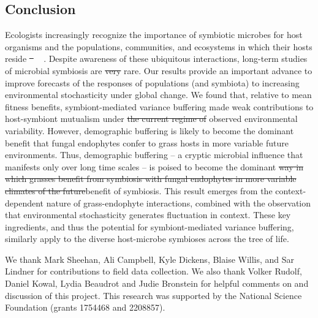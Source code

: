 \documentclass[lineno, sn-basic]{sn-jnl}%
\providecommand{\DIFadd}[1]{{\protect\color{blue}#1}} %
\providecommand{\DIFdel}[1]{{\protect\color{red}\protect\scriptsize\sout{#1}}}
\providecommand{\DIFadd}[1]{{\protect\color{blue}\uwave{#1}}} %
\providecommand{\DIFdel}[1]{{\protect\color{red}\sout{#1}}}                      %
\providecommand{\DIFaddbegin}{} %
\providecommand{\DIFaddend}{} %
\providecommand{\DIFdelbegin}{} %
\providecommand{\DIFdelend}{} %
\newcommand{\DIFscaledelfig}{0.5}
\newlength{\DIFdelgraphicswidth} %
\newlength{\DIFdelgraphicsheight} %
\newcommand{\DIFaddincludegraphics}[2][]{{\color{blue}\fbox{\DIFOincludegraphics[#1]{#2}}}} %
\newcommand{\DIFdelincludegraphics}[2][]{%
\sbox{\DIFdelgraphicsbox}{\DIFOincludegraphics[#1]{#2}}%
\settoboxwidth{\DIFdelgraphicswidth}{\DIFdelgraphicsbox} %
\settoboxtotalheight{\DIFdelgraphicsheight}{\DIFdelgraphicsbox} %
\scalebox{\DIFscaledelfig}{%
\parbox[b]{\DIFdelgraphicswidth}{\usebox{\DIFdelgraphicsbox}\\[-\baselineskip] \rule{\DIFdelgraphicswidth}{0em}}\llap{\resizebox{\DIFdelgraphicswidth}{\DIFdelgraphicsheight}{%
\setlength{\unitlength}{\DIFdelgraphicswidth}%
\begin{picture}(1,1)%
\thicklines\linethickness{2pt} %
{\color[rgb]{1,0,0}\put(0,0){\framebox(1,1){}}}%
{\color[rgb]{1,0,0}\put(0,0){\line( 1,1){1}}}%
{\color[rgb]{1,0,0}\put(0,1){\line(1,-1){1}}}%
\end{picture}%
}\hspace*{3pt}}} %
} %
\DeclareRobustCommand{\DIFaddbegin}{\DIFOaddbegin \let\includegraphics\DIFaddincludegraphics} %
\DeclareRobustCommand{\DIFaddend}{\DIFOaddend \let\includegraphics\DIFOincludegraphics} %
\DeclareRobustCommand{\DIFdelbegin}{\DIFOdelbegin \let\includegraphics\DIFdelincludegraphics} %
\DeclareRobustCommand{\DIFdelend}{\DIFOaddend \let\includegraphics\DIFOincludegraphics} %
\begin{document}
\subsection*{Conclusion}
Ecologists increasingly recognize the importance of symbiotic microbes for host organisms and the populations, communities, and ecosystems in which their hosts reside \DIFdelbegin \DIFdel{\mbox{%
\cite{afkhami2016native,smith2017symbiont,dallas2022captivity,wu2022reduction}}\hspace{0pt}%
}\DIFdelend \DIFaddbegin \DIFadd{\mbox{%
\citep{afkhami2016native,smith2017symbiont,dallas2022captivity,wu2022reduction}}\hspace{0pt}%
}\DIFaddend .
Despite awareness of these ubiquitous interactions, long-term studies of microbial symbiosis are \DIFdelbegin \DIFdel{very }\DIFdelend rare. 
Our results provide an important advance to improve forecasts of the responses of populations (and symbiota) to increasing environmental stochasticity under global change. 
We found that, relative to mean fitness benefits, symbiont-mediated variance buffering made weak contributions to host-symbiont mutualism under \DIFdelbegin \DIFdel{the current regime of }\DIFdelend \DIFaddbegin \DIFadd{observed }\DIFaddend environmental variability.
However, demographic buffering is likely to become the dominant benefit that fungal endophytes confer to grass hosts in more variable future environments.
Thus, demographic buffering -- a cryptic microbial influence that manifests only over long time scales -- is poised to become the dominant \DIFdelbegin \DIFdel{way in which grasses benefit from symbiosis with fungal endophytes in more variable climates of the future}\DIFdelend \DIFaddbegin \DIFadd{benefit of symbiosis}\DIFaddend .
This result emerges from the context-dependent nature of grass-endophyte interactions, combined with the observation that environmental stochasticity generates fluctuation in context. 
These key ingredients, and thus the potential for symbiont-mediated variance buffering, similarly apply to the diverse host-microbe symbioses across the tree of life. 
\newpage




\backmatter


We thank Mark Sheehan, Ali Campbell, Kyle Dickens, Blaise Willis, and Sar Lindner for contributions to field data collection. 
We also thank Volker Rudolf, Daniel Kowal, Lydia Beaudrot and Judie Bronstein for helpful comments on and discussion of this project. 
This research was supported by the National Science Foundation (grants 1754468 and 2208857). 
\end{document}
